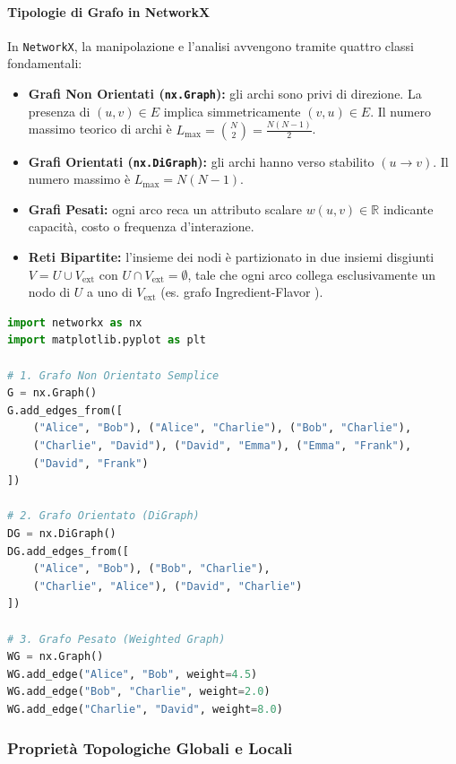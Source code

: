 \FloatBarrier
\paragraph{Tipologie di Grafo in NetworkX}
In \texttt{NetworkX}, la manipolazione e l'analisi avvengono tramite quattro classi fondamentali:
\begin{itemize}
    \item \textbf{Grafi Non Orientati (\texttt{nx.Graph}):} gli archi sono privi di direzione. La presenza di $(u, v) \in E$ implica simmetricamente $(v, u) \in E$. Il numero massimo teorico di archi è $L_{\max} = \binom{N}{2} = \frac{N(N-1)}{2}$.
    \item \textbf{Grafi Orientati (\texttt{nx.DiGraph}):} gli archi hanno verso stabilito $(u \to v)$. Il numero massimo è $L_{\max} = N(N-1)$.
    \item \textbf{Grafi Pesati:} ogni arco reca un attributo scalare $w(u, v) \in \mathbb{R}$ indicante capacità, costo o frequenza d'interazione.
    \item \textbf{Reti Bipartite:} l'insieme dei nodi è partizionato in due insiemi disgiunti $V = U \cup V_{\text{ext}}$ con $U \cap V_{\text{ext}} = \emptyset$, tale che ogni arco collega esclusivamente un nodo di $U$ a uno di $V_{\text{ext}}$ (es. grafo Ingredient-Flavor \cite{barabasi2016}).
\end{itemize}

\begin{lstlisting}[language=Python, caption={Inizializzazione e popolamento di grafi non orientati, orientati e pesati.}]
import networkx as nx
import matplotlib.pyplot as plt

# 1. Grafo Non Orientato Semplice
G = nx.Graph()
G.add_edges_from([
    ("Alice", "Bob"), ("Alice", "Charlie"), ("Bob", "Charlie"),
    ("Charlie", "David"), ("David", "Emma"), ("Emma", "Frank"),
    ("David", "Frank")
])

# 2. Grafo Orientato (DiGraph)
DG = nx.DiGraph()
DG.add_edges_from([
    ("Alice", "Bob"), ("Bob", "Charlie"),
    ("Charlie", "Alice"), ("David", "Charlie")
])

# 3. Grafo Pesato (Weighted Graph)
WG = nx.Graph()
WG.add_edge("Alice", "Bob", weight=4.5)
WG.add_edge("Bob", "Charlie", weight=2.0)
WG.add_edge("Charlie", "David", weight=8.0)
\end{lstlisting}

\FloatBarrier
\subsubsection{Proprietà Topologiche Globali e Locali}
\label{subsec:lab-topological-measures}

